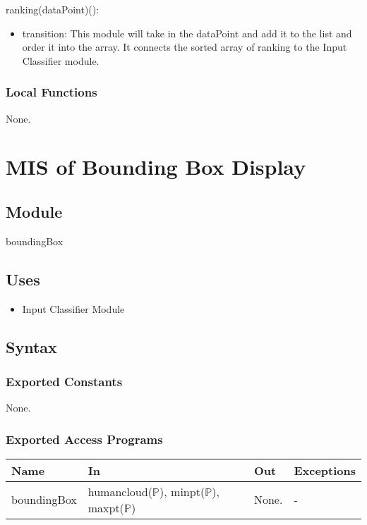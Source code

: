 \documentclass[12pt, titlepage]{article}
\begin{document}
\noindent ranking(dataPoint)():
\begin{itemize}
  \item transition: This module will take in the dataPoint and add it to the list and order it into the array. It connects the sorted array of ranking to the Input Classifier module.
\end{itemize}

\subsubsection{Local Functions}

None.
\newpage


\section{MIS of Bounding Box Display} \label{ModuleBBD} 

\subsection{Module}

boundingBox

\subsection{Uses}

\begin{itemize}
  \item Input Classifier Module
\end{itemize}

\subsection{Syntax}

\subsubsection{Exported Constants}

None.

\subsubsection{Exported Access Programs}

\begin{center}
\begin{tabular}{p{3cm} p{4cm} p{2cm} p{2cm}}
\hline
\textbf{Name} & \textbf{In} & \textbf{Out} & \textbf{Exceptions} \\
\hline
boundingBox & humancloud($\mathbb{P}$),
              minpt($\mathbb{P}$),
              maxpt($\mathbb{P}$) & None. & - \\
\hline
\end{tabular}
\end{center}
\end{document}
